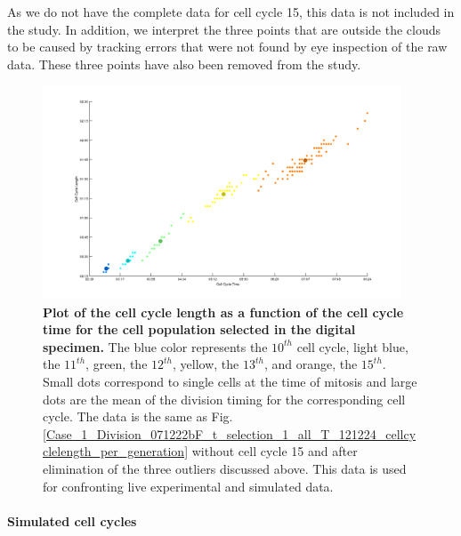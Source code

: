 As we do not have the complete data for cell cycle 15, this data is not included in the study. In addition, we interpret the three points that are outside the clouds to be caused by tracking errors that were not found by eye inspection of the raw data. These three points have also been removed from the study.
\begin{figure}
\begin{center}
\includegraphics[width=0.95\textwidth]{../../images/Cases_Studies/Case_1_Division/071222bF_t_selection_1_all_T_121224_cellcyclelength_per_generation_MATLAB_mean.png}
\end{center}
\caption{\textbf{Plot of the cell cycle length as a function of the cell cycle time for the cell population selected in the digital specimen.} The blue color represents the $10^{th}$ cell cycle, light blue, the $11^{th}$, green, the $12^{th}$, yellow, the $13^{th}$, and orange, the $15^{th}$. Small dots correspond to single cells at the time of mitosis and large dots are the mean of the division timing for the corresponding cell cycle. The data is the same as Fig. \ref{Case_1_Division_071222bF_t_selection_1_all_T_121224_cellcyclelength_per_generation} without cell cycle 15 and after elimination of the three outliers discussed above. This data is used for confronting live experimental and simulated data.}
\label{071222bF_t_selection_1_all_T_121224_cellcyclelength_per_generation_MATLAB_mean}
\end{figure}

\paragraph{Simulated cell cycles}



